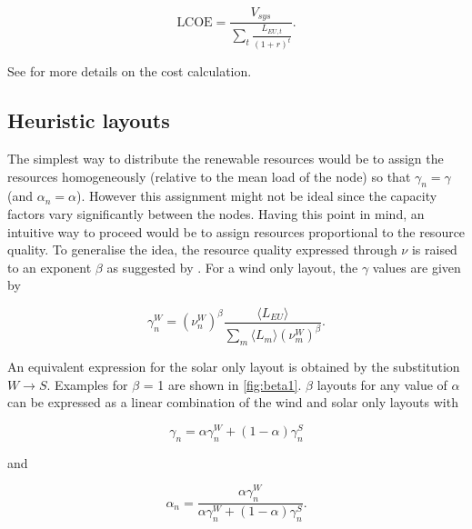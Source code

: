 \documentclass[a4paper, 12pt, sort&compress]{elsarticle}%
\newcommand{\paren}[1]{\left(#1\right)}
\begin{document}
\begin{equation}
  \label{eq:7}
  \text{LCOE} = \frac{V_{sys}}{\sum_{t} \frac{L_{EU,
        t}}{\paren{1+r}^{t}}} .
\end{equation}

See \cite{Sensitivity} for more details on the cost calculation.

\subsection{Heuristic layouts}
\label{sec:heuristic-layouts}

The simplest way to distribute the renewable resources would be to
assign the resources homogeneously (relative to the mean load of the
node) so that $\gamma_{n} = \gamma$ (and $\alpha_{n} = \alpha$). However this assignment
might not be ideal since the capacity factors vary significantly
between the nodes. Having this point in mind, an intuitive way to
proceed would be to assign resources proportional to the resource
quality. To generalise the idea, the resource quality expressed
through $\nu$ is raised to an exponent $\beta$ as suggested by
\cite{Rolando}. For a wind only layout, the $\gamma$ values are given by

\begin{equation}
  \label{eq:8}
  \gamma_{n}^{W} = \paren{\nu^{W}_{n}}^{\beta} \frac{\langle L_{EU}
    \rangle}{\sum_{m} \langle L_{m}
    \rangle \paren{\nu^{W}_{m}}^{\beta}}.
\end{equation}

An equivalent expression for the solar only layout is obtained by the
substitution $W \to S$. Examples for $\beta$ = 1 are shown in
\cref{fig:beta1}. $\beta$ layouts for any value of $\alpha$ can be expressed as
a linear combination of the wind and solar only layouts with


\begin{equation}
  \label{eq:9}
  \gamma_{n} = \alpha \gamma^{W}_{n} + (1-\alpha) \gamma^{S}_{n} 
\end{equation}

and

\begin{equation}
  \label{eq:9}
  \alpha_{n} = \frac{\alpha \gamma_{n}^{W}}{\alpha \gamma_{n}^{W} + (1-\alpha) \gamma_{n}^{S}} .
\end{equation}
\end{document}
